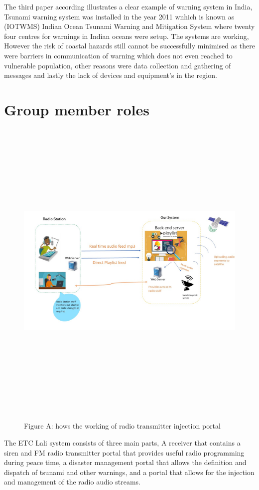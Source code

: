 The third paper according \cite{hemachandra2019regional} illustrates a clear example of warning system in India, Tsunami warning system was installed in the year 2011 wnhich is known as (IOTWMS) Indian Ocean Tsunami Warning and Mitigation System where twenty four centres for warnings in Indian oceans were setup. The systems are working, However the risk of coastal hazards still cannot be successfully minimised as there were barriers in communication of warning which does not even reached to vulnerable population, other reasons were data collection and gathering of messages and lastly the lack of devices and equipment’s in the region.  

\section{Group member roles}
 \begin{figure}
\begin{centering}
\includegraphics[width=15cm,height=15cm,keepaspectratio]{Figures/1.jpg}\\
\caption{Figure A: hows the working of radio transmitter injection portal}
\label{radio-transmitter-injection-portal}
\end{centering}
\end{figure}
The ETC Lali system consists of three main parts, A receiver that contains a siren and FM radio transmitter portal that provides useful radio programming during peace time, a disaster management portal that allows the definition and dispatch of tsunami and other warnings, and a portal that allows for the injection and management of the radio audio streams.\\

